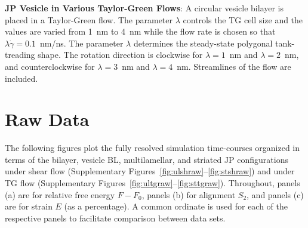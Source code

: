 
\noindent
{\label{MovieS6}\bf JP Vesicle in Various Taylor-Green Flows}: A
circular vesicle bilayer is placed in a Taylor-Green flow. The parameter
$\lambda$ controls the TG cell size and the values are varied from 1~nm
to 4~nm while the flow rate is chosen so that
$\lambda\dot\gamma=0.1$~nm/ns. The parameter $\lambda$ determines the
steady-state polygonal tank-treading shape. The rotation direction is
clockwise for $\lambda=1$~nm and $\lambda=2$~nm, and counterclockwise
for $\lambda=3$~nm and $\lambda=4$~nm. Streamlines of the flow are
included.



\section{Raw Data}
The following figures plot the fully resolved simulation time-courses
organized in terms of the bilayer, vesicle BL, multilamellar, and
striated JP configurations under shear flow (Supplementary
Figures~\ref{fig:ulshraw}--\ref{fig:stshraw}) and under TG flow
(Supplementary Figures~\ref{fig:ultgraw}--\ref{fig:sttgraw}).
Throughout, panels (a) are for relative free energy $F - F_0$, panels
(b) for alignment $S_2$, and panels (c) are for strain $E$ (as a
percentage).  A common ordinate is used for each of the respective
panels to facilitate comparison between data sets. 


